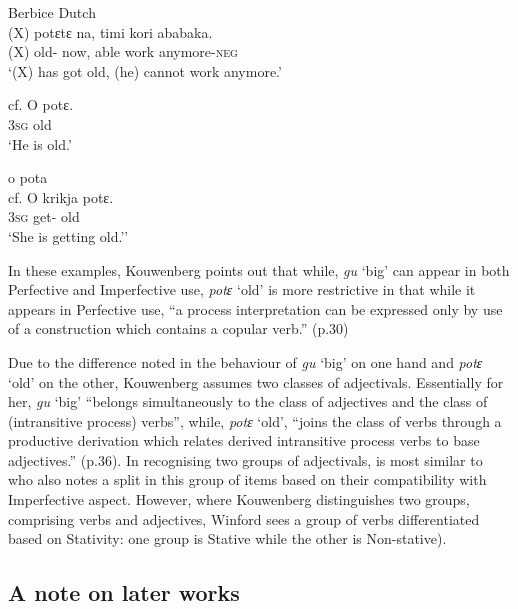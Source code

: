Berbice Dutch \\
\ea
\gll (X)   potɛtɛ na, timi kori ababaka.     \\
(X) old-{\PF} now, able work anymore-\textsc{neg}  \\
\glt `(X) has got old, (he) cannot work anymore.'

cf.
\gll O pot{ɛ}.\\
           \textsc{3sg} old\\
\glt `He is old.'

\ex *o pota \\
cf. \gll O krikja potɛ.\\
	\textsc{3sg} get-{\IPF} old\\
\glt `She is getting old.''  \z \z %

In these examples, Kouwenberg points out that while, \textit{gu} `big'
can appear in both Perfective and Imperfective use, \textit{potɛ}
 `old' is more restrictive in that while it appears in Perfective use,
“a process interpretation can be expressed only by use of a
construction which contains a copular verb.” (p.30)

Due to the difference noted in the behaviour of \textit{gu} `big' on
one hand and \textit{potɛ} `old' on the other, Kouwenberg assumes two
classes of adjectivals. Essentially for her, \textit{gu} `big'
“belongs simultaneously to the class of adjectives and the class of
(intransitive process) verbs”, while, \textit{potɛ} `old', “joins
the class of verbs through a productive derivation which relates
derived intransitive process verbs to base adjectives.” (p.36).  In
recognising two groups of adjectivals, \citet{Kouwenberg1996} is most
similar to \citet{Winford1993} who also notes a split in this group of
items based on their compatibility with Imperfective aspect.  However,
where Kouwenberg distinguishes two groups, comprising verbs and
adjectives, Winford sees a group of verbs differentiated based on
Stativity: one group is Stative while the other is Non-stative).

\subsection{ A note on later works}\label{sec:3.1.3}

